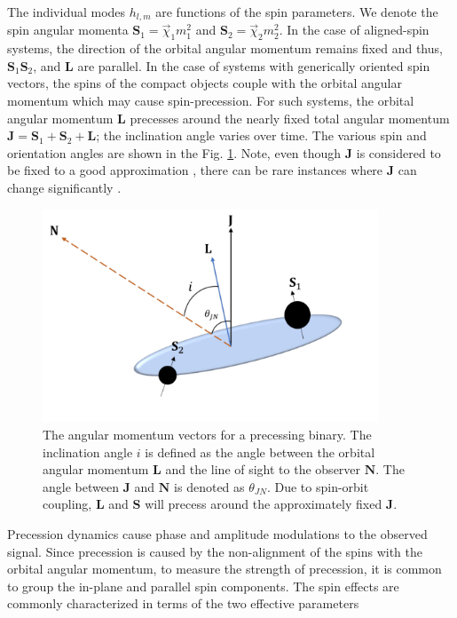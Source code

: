 The individual modes $h_{l,m}$ are functions of the spin parameters.
We denote the spin angular momenta $\textbf{S}_1 = \vec{\chi}_1 m_1^2$ and $\textbf{S}_2= \vec{\chi}_2 m_2^2$.  In the case of aligned-spin systems, the direction of the orbital angular momentum remains fixed and thus, $\textbf{S}_1 \textbf{S}_2$, and $\textbf{L}$ are parallel. In the case of systems with generically oriented spin vectors, the spins of the compact objects couple with the orbital angular momentum which may cause spin-precession. For such systems, the orbital angular momentum $\textbf{L}$ precesses around the nearly fixed total angular momentum $\textbf{J} = \textbf{S}_1 + \textbf{S}_2 + \textbf{L}$; the inclination angle varies over time. The various spin and orientation angles are shown in the Fig. \ref{fig:precessing_angles}. Note, even though $\textbf{J}$ is considered to be fixed to a good approximation \cite{Apostolatos:1994mx}, there can be rare instances where $\textbf{J}$ can change significantly \cite{Apostolatos:1994mx}. 

\begin{figure}[]
    \centering
    \includegraphics[width=10cm]{figures/HM_and_precession/Precessing_angles.pdf}
    \caption{The angular momentum vectors for a precessing binary. The inclination angle $i$ is defined as the angle between the orbital angular momentum $\textbf{L}$ and the line of sight to the observer $\textbf{N}$. The angle between $\textbf{J}$ and $\textbf{N}$ is denoted as $\theta_{JN}$. Due to spin-orbit coupling, $\textbf{L}$ and $\textbf{S}$ will precess around the approximately fixed $\textbf{J}$.} 
    \label{fig:precessing_angles}
\end{figure}

Precession dynamics cause phase and amplitude modulations to the observed signal. Since precession is caused by the non-alignment of the spins with the orbital angular momentum, to measure the strength of precession, it is common to group the in-plane and parallel spin components. The spin effects are commonly characterized in terms of the two effective parameters \cite{Ajith:2009bn, Schmidt:2014iyl}

